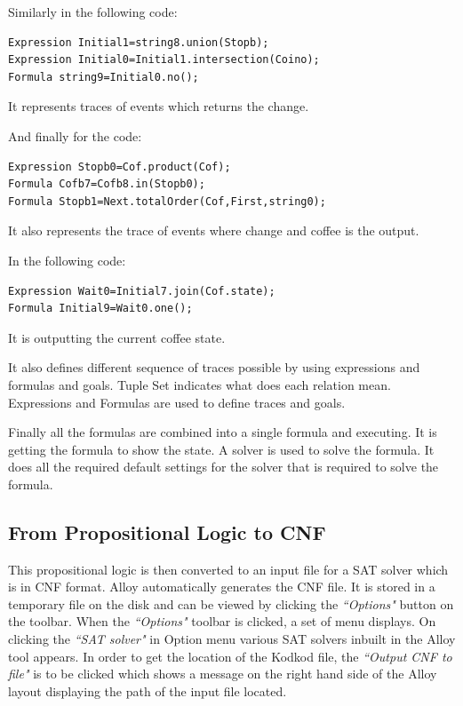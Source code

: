 \documentclass[a4paper,12pt]{report}
\begin{document}
Similarly in the following code: 
\begin{verbatim}
Expression Initial1=string8.union(Stopb);
Expression Initial0=Initial1.intersection(Coino);
Formula string9=Initial0.no();
\end{verbatim}
It represents traces of events which returns the change.

And finally for the code:
\begin{verbatim}
Expression Stopb0=Cof.product(Cof);
Formula Cofb7=Cofb8.in(Stopb0);
Formula Stopb1=Next.totalOrder(Cof,First,string0);
\end{verbatim}
It also represents the trace of events where change and coffee is the output. 

In the following code:
\begin{verbatim}
Expression Wait0=Initial7.join(Cof.state);
Formula Initial9=Wait0.one();
\end{verbatim}
It is outputting the current coffee state.

It also defines different sequence of traces possible by using expressions and formulas and goals. Tuple Set indicates what does each relation mean. Expressions and Formulas are used to define traces and goals.

Finally all the formulas are combined into a single formula and executing. It is getting the formula to show the state. A solver is used to solve the formula. It does all the required default settings for the solver that is required to solve the formula.
 
\subsection{From Propositional Logic to CNF}
\label{Prop to CNF} 
This propositional logic is then converted to an input file for a SAT solver which is in CNF format. Alloy automatically generates the CNF file. It is stored in a temporary file on the disk and can be viewed by clicking the \textit{``Options"} button on the toolbar. When the \textit{``Options"} toolbar is clicked, a set of menu displays. On clicking the \textit{``SAT solver"} in Option menu various SAT solvers inbuilt in the Alloy tool appears. In order to get the location of the Kodkod file, the \textit{``Output CNF to file"} is to be clicked which shows a message on the right hand side of the Alloy layout displaying the path of the input file located.
\end{document}
